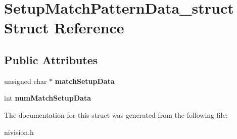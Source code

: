 \hypertarget{structSetupMatchPatternData__struct}{
\section{SetupMatchPatternData\_\-struct Struct Reference}
\label{structSetupMatchPatternData__struct}
}
\subsection*{Public Attributes}
\begin{DoxyCompactItemize}
\item 
\hypertarget{structSetupMatchPatternData__struct_af89f4c080808afdf015c55bfbc596e91}{
unsigned char $\ast$ {\bfseries matchSetupData}}
\label{structSetupMatchPatternData__struct_af89f4c080808afdf015c55bfbc596e91}

\item 
\hypertarget{structSetupMatchPatternData__struct_afaad479c2ef40645d86445cc498034d7}{
int {\bfseries numMatchSetupData}}
\label{structSetupMatchPatternData__struct_afaad479c2ef40645d86445cc498034d7}

\end{DoxyCompactItemize}


The documentation for this struct was generated from the following file:\begin{DoxyCompactItemize}
\item 
nivision.h\end{DoxyCompactItemize}
